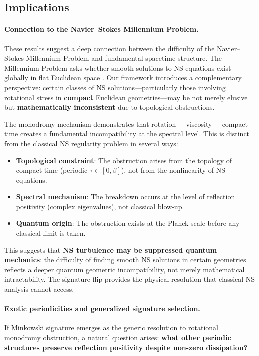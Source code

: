 \documentclass[11pt]{article}
\begin{document}
\subsection{Implications}

\paragraph{Connection to the Navier--Stokes Millennium Problem.}
These results suggest a deep connection between the difficulty of the Navier--Stokes 
Millennium Problem and fundamental spacetime structure. The Millennium Problem asks 
whether smooth solutions to NS equations exist globally in flat Euclidean space 
\cite{NavierStokesMillennium}. Our framework introduces a complementary perspective: 
certain classes of NS solutions---particularly those involving rotational stress in 
\textbf{compact} Euclidean geometries---may be not merely elusive but 
\textbf{mathematically inconsistent} due to topological obstructions.

The monodromy mechanism demonstrates that rotation + viscosity + compact time creates 
a fundamental incompatibility at the spectral level. This is distinct from the 
classical NS regularity problem in several ways:

\begin{itemize}
\item \textbf{Topological constraint}: The obstruction arises from the topology of 
compact time (periodic $\tau \in [0,\beta]$), not from the nonlinearity of NS equations.

\item \textbf{Spectral mechanism}: The breakdown occurs at the level of reflection 
positivity (complex eigenvalues), not classical blow-up.

\item \textbf{Quantum origin}: The obstruction exists at the Planck scale before 
any classical limit is taken.
\end{itemize}

This suggests that \textbf{NS turbulence may be suppressed quantum mechanics}: the 
difficulty of finding smooth NS solutions in certain geometries reflects a deeper 
quantum geometric incompatibility, not merely mathematical intractability. The 
signature flip provides the physical resolution that classical NS analysis cannot access.

\paragraph{Exotic periodicities and generalized signature selection.}
If Minkowski signature emerges as the generic resolution to rotational monodromy 
obstruction, a natural question arises: \textbf{what other periodic structures 
preserve reflection positivity despite non-zero dissipation?}
\end{document}

